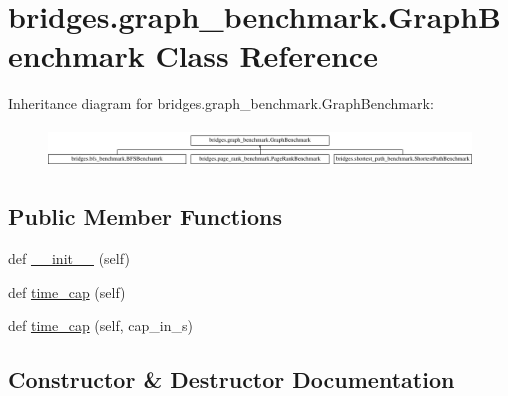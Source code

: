 \hypertarget{classbridges_1_1graph__benchmark_1_1_graph_benchmark}{}\section{bridges.\+graph\+\_\+benchmark.\+Graph\+Benchmark Class Reference}
\label{classbridges_1_1graph__benchmark_1_1_graph_benchmark}
Inheritance diagram for bridges.\+graph\+\_\+benchmark.\+Graph\+Benchmark\+:\begin{figure}[H]
\begin{center}
\leavevmode
\includegraphics[height=1.072797cm]{classbridges_1_1graph__benchmark_1_1_graph_benchmark}
\end{center}
\end{figure}
\subsection*{Public Member Functions}
\begin{DoxyCompactItemize}
\item 
def \mbox{\hyperlink{classbridges_1_1graph__benchmark_1_1_graph_benchmark_ad533ee7b030adf354478439cbe26ff1f}{\+\_\+\+\_\+init\+\_\+\+\_\+}} (self)
\item 
def \mbox{\hyperlink{classbridges_1_1graph__benchmark_1_1_graph_benchmark_a566f3fa801aaa5ea87752ebcf37d7744}{time\+\_\+cap}} (self)
\item 
def \mbox{\hyperlink{classbridges_1_1graph__benchmark_1_1_graph_benchmark_a4a3b4a03513c996c6ed20c7d163fe621}{time\+\_\+cap}} (self, cap\+\_\+in\+\_\+s)
\end{DoxyCompactItemize}


\subsection{Constructor \& Destructor Documentation}
\mbox{\label{classbridges_1_1graph__benchmark_1_1_graph_benchmark_ad533ee7b030adf354478439cbe26ff1f}} 
